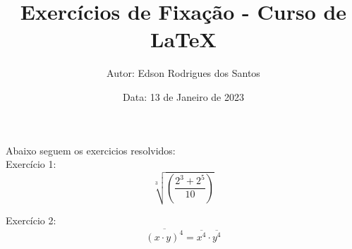 \documentclass[a4paper, 12pt]{article}
\title{\textbf{Exercícios de Fixação - Curso de LaTeX}}
\author{Autor: Edson Rodrigues dos Santos}
\date{Data: 13 de Janeiro de 2023}
\begin{document}
\maketitle

Abaixo seguem os exercicios resolvidos:\\


Exercício 1:
\begin{equation}
\sqrt[3]{\left( \frac{2^3 + 2^5}{10}\right) }
\end{equation}

Exercício 2:
\begin{equation}
\overline{(x \cdot y) ^4} = \overline{x^4} \cdot \overline{y^4}
\end{equation}
\end{document}
